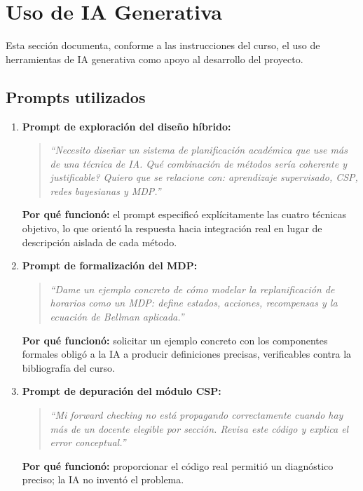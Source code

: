 \documentclass[12pt,twoside]{report}
\theoremstyle{definition}
\begin{document}
\section{Uso de IA Generativa}
\label{sec:ia}

\begin{importante}
Esta secci\'on documenta, conforme a las instrucciones del curso, el uso de
herramientas de IA generativa como apoyo al desarrollo del proyecto.
\end{importante}

\subsection{Prompts utilizados}

\begin{enumerate}[leftmargin=2em,itemsep=8pt]

  \item \textbf{Prompt de exploraci\'on del dise\~no h\'ibrido:}
  \begin{quote}\itshape
  ``Necesito dise\~nar un sistema de planificaci\'on acad\'emica que use m\'as de una
  t\'ecnica de IA.  Qu\'e combinaci\'on de m\'etodos ser\'ia coherente y justificable?
  Quiero que se relacione con: aprendizaje supervisado, CSP, redes bayesianas y MDP.''
  \end{quote}
  \textbf{Por qu\'e funcion\'o:} el prompt especific\'o expl\'icitamente las cuatro
  t\'ecnicas objetivo, lo que orient\'o la respuesta hacia integraci\'on real en lugar
  de descripci\'on aislada de cada m\'etodo.

  \vspace{3cm}

  \item \textbf{Prompt de formalizaci\'on del MDP:}
  \begin{quote}\itshape
  ``Dame un ejemplo concreto de c\'omo modelar la replanificaci\'on de horarios como
  un MDP: define estados, acciones, recompensas y la ecuaci\'on de Bellman aplicada.''
  \end{quote}
  \textbf{Por qu\'e funcion\'o:} solicitar un ejemplo concreto con los componentes
  formales oblig\'o a la IA a producir definiciones precisas, verificables contra la
  bibliograf\'ia del curso.

  \item \textbf{Prompt de depuraci\'on del m\'odulo CSP:}
  \begin{quote}\itshape
  ``Mi forward checking no est\'a propagando correctamente cuando hay m\'as de un docente
  elegible por secci\'on.  Revisa este c\'odigo y explica el error conceptual.''
  \end{quote}
  \textbf{Por qu\'e funcion\'o:} proporcionar el c\'odigo real permiti\'o un
  diagn\'ostico preciso; la IA no invent\'o el problema.

\end{enumerate}
\end{document}
